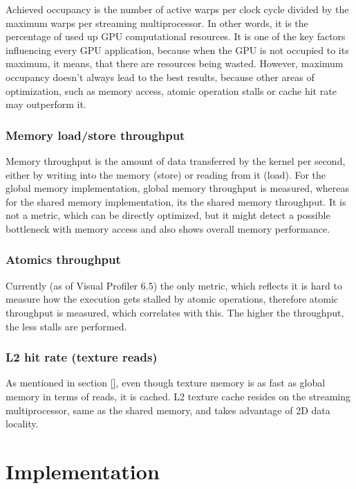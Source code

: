 Achieved occupancy is the number of active warps per clock cycle divided by the maximum warps per streaming multiprocessor. In other words, it is the percentage of used up GPU computational resources. It is one of the key factors influencing every GPU application, because when the GPU is not occupied to its maximum, it means, that there are resources being wasted. However, maximum occupancy doesn't always lead to the best results, because other areas of optimization, such as memory access, atomic operation stalls or cache hit rate may outperform it.

\subsection{Memory load/store throughput}\label{subsec:memory-throughtput}

Memory throughput is the amount of data transferred by the kernel per second, either by writing into the memory (store) or reading from it (load). For the global memory implementation, global memory throughput is measured, whereas for the shared memory implementation, its the shared memory throughput. It is not a metric, which can be directly optimized, but it might detect a possible bottleneck with memory access and also shows overall memory performance.

\subsection{Atomics throughput}\label{subsec:atomics-throughput}

Currently (as of Visual Profiler 6.5) the only metric, which reflects it is hard to measure how the execution gets stalled by atomic operations, therefore atomic throughput is measured, which correlates with this. The higher the throughput, the less stalls are performed.

\subsection{L2 hit rate (texture reads)} \label{subsec:l2-hit-rate-texture}

As mentioned in section \ref{}, even though texture memory is as fast as global memory in terms of reads, it is cached. L2 texture cache resides on the streaming multiprocessor, same as the shared memory, and takes advantage of 2D data locality. 

\chapter{Implementation}\label{ch:implementation}

